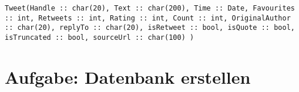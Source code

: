 \begin{verbatim}
Tweet(Handle :: char(20), Text :: char(200), Time :: Date, Favourites :: int, Retweets :: int, Rating :: int, Count :: int, OriginalAuthor :: char(20), replyTo :: char(20), isRetweet :: bool, isQuote :: bool, isTruncated :: bool, sourceUrl :: char(100) )
\end{verbatim}

\section{Aufgabe: Datenbank erstellen}
	

